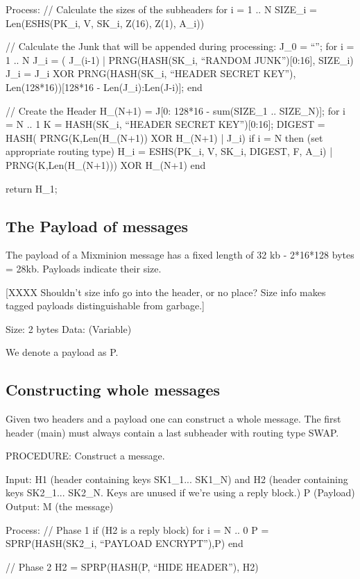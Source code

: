 Process: 
  // Calculate the sizes of the subheaders
  for i = 1 .. N
	SIZE_i = Len(ESHS(PK_i, V, SK_i, Z(16), Z(1), A_i))

  // Calculate the Junk that will be appended during processing:
  J_0 = ``'';
  for i = 1 .. N
	J_i = ( J_(i-1) | PRNG(HASH(SK_i, ``RANDOM JUNK'')[0:16], SIZE_i)
	J_i = J_i XOR PRNG(HASH(SK_i, ``HEADER SECRET KEY''),
  		Len(128*16))[128*16 - Len(J_i):Len(J-i)];
  end

  // Create the Header
  H_(N+1) = J[0: 128*16 - sum(SIZE_1 .. SIZE_N)];
  for i = N .. 1
	K = HASH(SK_i, ``HEADER SECRET KEY'')[0:16];
  	DIGEST = HASH( PRNG(K,Len(H_(N+1)) XOR H_(N+1) | J_i)
	if i = N then (set appropriate routing type)
	H_i = ESHS(PK_i, V, SK_i, DIGEST, F, A_i) | PRNG(K,Len(H_(N+1))) XOR H_(N+1)
  end

return H_1;

\subsection{The Payload of messages}

The payload of a Mixminion message has a fixed length of 32 kb
- 2*16*128 bytes = 28kb.   Payloads indicate their size.

  [XXXX Shouldn't size info go into the header, or no place?  Size
  info makes tagged payloads distinguishable from garbage.]

Size:   2 bytes
Data:   (Variable)

We denote a payload as P.

\subsection{Constructing whole messages}

Given two headers and a payload one can construct a whole
message. The first header (main) must always contain a last subheader
with routing type SWAP.  

PROCEDURE: Construct a message.

Input: H1 (header containing keys SK1_1... SK1_N)
       and H2 (header containing keys SK2_1... SK2_N.  Keys are unused
            if we're using a reply block.)
       P (Payload)
Output: M (the message)

Process:
	// Phase 1
	if (H2 is a reply block)
		for i = N .. 0
			P = SPRP(HASH(SK2_i, ``PAYLOAD ENCRYPT''),P)
		end

	// Phase 2
	H2 = SPRP(HASH(P, ``HIDE HEADER''), H2)

